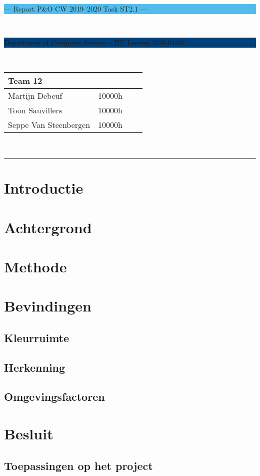 \documentclass[a4paper,11pt]{article}
\begin{document}
\noindent
\colorbox[HTML]{52BDEC}{\bfseries\parbox{\textwidth}{\centering\large
  --- Report P\&O CW 2019--2020 Task ST2.1 ---
}}
\\[-1mm]
\colorbox[HTML]{00407A}{\bfseries\color{white}\parbox{\textwidth}{
  Department of Computer Science -- KU Leuven
  \hfill
  \today
}}
\\

\smallskip

\noindent
\begin{tabular}{*4l}
\toprule
\multicolumn{2}{l}{\large\textbf{Team 12}} \\
\midrule
Martijn Debeuf &  10000h\\ %
Toon Sauvillers &  10000h\\
Seppe Van Steenbergen & 10000h \\
\bottomrule
\hline
\end{tabular}\\

\noindent
{\color[HTML]{52BDEC} \rule{\linewidth}{1mm} }

\section{Introductie}\label{sec:introductie}
	

\section{Achtergrond}\label{sec:achtergrond}
	

\section{Methode}\label{sec:methode}
	

\section{Bevindingen}\label{sec:bevindingen}
	

	\subsection{Kleurruimte}\label{subsec:kleurruimte}
		
	\subsection{Herkenning}\label{subsec:herkenning}
		
	\subsection{Omgevingsfactoren}\label{subsec:omgevingsfactoren}
		

\section{Besluit}\label{sec:besluit}
	
	
	\subsection{Toepassingen op het project}\label{subsec:toepassingen}
		
\end{document}
